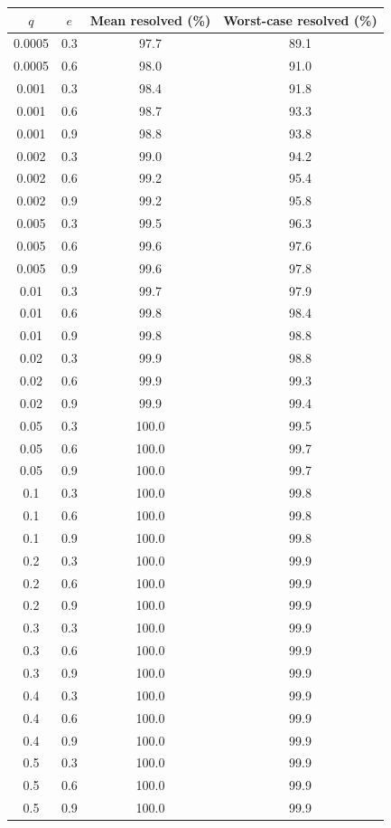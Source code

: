 \begin{table}[h]
\centering
\begin{tabular}{cccc}
\hline
$q$ & $e$ & Mean resolved (\%) & Worst-case resolved (\%) \\
\hline
0.0005 & 0.3 & 97.7 & 89.1 \\
0.0005 & 0.6 & 98.0 & 91.0 \\
0.001 & 0.3 & 98.4 & 91.8 \\
0.001 & 0.6 & 98.7 & 93.3 \\
0.001 & 0.9 & 98.8 & 93.8 \\
0.002 & 0.3 & 99.0 & 94.2 \\
0.002 & 0.6 & 99.2 & 95.4 \\
0.002 & 0.9 & 99.2 & 95.8 \\
0.005 & 0.3 & 99.5 & 96.3 \\
0.005 & 0.6 & 99.6 & 97.6 \\
0.005 & 0.9 & 99.6 & 97.8 \\
0.01 & 0.3 & 99.7 & 97.9 \\
0.01 & 0.6 & 99.8 & 98.4 \\
0.01 & 0.9 & 99.8 & 98.8 \\
0.02 & 0.3 & 99.9 & 98.8 \\
0.02 & 0.6 & 99.9 & 99.3 \\
0.02 & 0.9 & 99.9 & 99.4 \\
0.05 & 0.3 & 100.0 & 99.5 \\
0.05 & 0.6 & 100.0 & 99.7 \\
0.05 & 0.9 & 100.0 & 99.7 \\
0.1 & 0.3 & 100.0 & 99.8 \\
0.1 & 0.6 & 100.0 & 99.8 \\
0.1 & 0.9 & 100.0 & 99.8 \\
0.2 & 0.3 & 100.0 & 99.9 \\
0.2 & 0.6 & 100.0 & 99.9 \\
0.2 & 0.9 & 100.0 & 99.9 \\
0.3 & 0.3 & 100.0 & 99.9 \\
0.3 & 0.6 & 100.0 & 99.9 \\
0.3 & 0.9 & 100.0 & 99.9 \\
0.4 & 0.3 & 100.0 & 99.9 \\
0.4 & 0.6 & 100.0 & 99.9 \\
0.4 & 0.9 & 100.0 & 99.9 \\
0.5 & 0.3 & 100.0 & 99.9 \\
0.5 & 0.6 & 100.0 & 99.9 \\
0.5 & 0.9 & 100.0 & 99.9 \\

\end{tabular}
\end{table}
